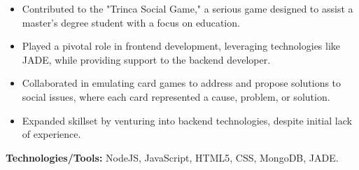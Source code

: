 \documentclass[10pt,a4paper]{altacv}
\begin{document}
\begin{itemize}
    \setlength{\itemindent}{0.5em}
    \item[--] Contributed to the "Trinca Social Game," a serious game designed to assist a master's degree student with a focus on education.
    \item[--] Played a pivotal role in frontend development, leveraging technologies like JADE, while providing support to the backend developer.
    \item[--] Collaborated in emulating card games to address and propose solutions to social issues, where each card represented a cause, problem, or solution.
    \item[--] Expanded skillset by venturing into backend technologies, despite initial lack of experience.
\end{itemize}
\textbf{Technologies/Tools:} NodeJS, JavaScript, HTML5, CSS, MongoDB, JADE.







   
   

\end{document}

